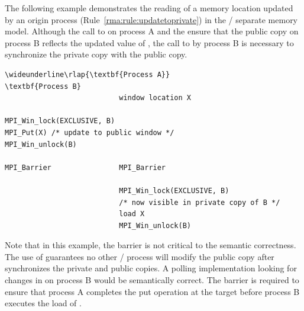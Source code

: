 \begin{example}
\label{ex:mpi_rma_rule6}
%
The following example demonstrates the reading of a memory location
updated by an origin process (Rule~\ref{rma:rule:updatetoprivate}) in
the \RMA/ separate memory model.  Although the call to
 on process A and the 
ensure that the public copy on process B reflects the updated value of ,
the call to  by process B is necessary to
synchronize the private copy with the public copy.
\begin{Verbatim}[commandchars=\\\{\}]
\wideunderline\rlap{\textbf{Process A}}                           \textbf{Process B}
                           window location X

MPI_Win_lock(EXCLUSIVE, B)
MPI_Put(X) /* update to public window */
MPI_Win_unlock(B)

MPI_Barrier                MPI_Barrier

                           MPI_Win_lock(EXCLUSIVE, B)
                           /* now visible in private copy of B */
                           load X
                           MPI_Win_unlock(B)
\end{Verbatim}
\lstset{fancyvrb=false}
Note that in this example, the barrier is not critical to the semantic
correctness.  The use of  guarantees no other \mpi/ process
will modify the public copy after 
synchronizes the private and public copies.  A polling
implementation looking for changes in  on process B would be
semantically correct.
The barrier is required to ensure that process A 
completes the put operation at the target before process B executes the load of .
\end{example}

